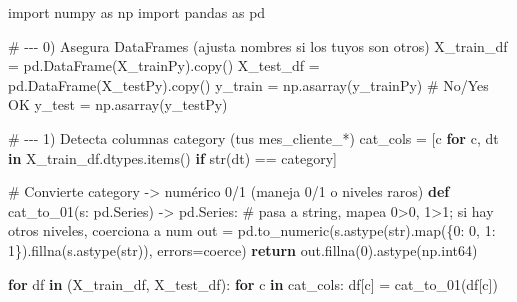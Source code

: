 \documentclass[
  letterpaper,
  DIV=11,
  numbers=noendperiod]{scrartcl}
\newenvironment{Shaded}{\begin{snugshade}}{\end{snugshade}}
\newcommand{\BuiltInTok}[1]{\textcolor[rgb]{0.00,0.23,0.31}{#1}}
\newcommand{\CommentTok}[1]{\textcolor[rgb]{0.37,0.37,0.37}{#1}}
\newcommand{\ControlFlowTok}[1]{\textcolor[rgb]{0.00,0.23,0.31}{\textbf{#1}}}
\newcommand{\DecValTok}[1]{\textcolor[rgb]{0.68,0.00,0.00}{#1}}
\newcommand{\ImportTok}[1]{\textcolor[rgb]{0.00,0.46,0.62}{#1}}
\newcommand{\KeywordTok}[1]{\textcolor[rgb]{0.00,0.23,0.31}{\textbf{#1}}}
\newcommand{\NormalTok}[1]{\textcolor[rgb]{0.00,0.23,0.31}{#1}}
\newcommand{\OperatorTok}[1]{\textcolor[rgb]{0.37,0.37,0.37}{#1}}
\newcommand{\StringTok}[1]{\textcolor[rgb]{0.13,0.47,0.30}{#1}}
\begin{document}
\begin{Shaded}
\begin{Highlighting}[]
\ImportTok{import}\NormalTok{ numpy }\ImportTok{as}\NormalTok{ np}
\ImportTok{import}\NormalTok{ pandas }\ImportTok{as}\NormalTok{ pd}

\CommentTok{\# {-}{-}{-} 0) Asegura DataFrames (ajusta nombres si los tuyos son otros)}
\NormalTok{X\_train\_df }\OperatorTok{=}\NormalTok{ pd.DataFrame(X\_trainPy).copy()}
\NormalTok{X\_test\_df  }\OperatorTok{=}\NormalTok{ pd.DataFrame(X\_testPy).copy()}
\NormalTok{y\_train }\OperatorTok{=}\NormalTok{ np.asarray(y\_trainPy)   }\CommentTok{\# \textquotesingle{}No\textquotesingle{}/\textquotesingle{}Yes\textquotesingle{} OK}
\NormalTok{y\_test  }\OperatorTok{=}\NormalTok{ np.asarray(y\_testPy)}

\CommentTok{\# {-}{-}{-} 1) Detecta columnas category (tus mes\_cliente\_*)}
\NormalTok{cat\_cols }\OperatorTok{=}\NormalTok{ [c }\ControlFlowTok{for}\NormalTok{ c, dt }\KeywordTok{in}\NormalTok{ X\_train\_df.dtypes.items() }\ControlFlowTok{if} \BuiltInTok{str}\NormalTok{(dt) }\OperatorTok{==} \StringTok{\textquotesingle{}category\textquotesingle{}}\NormalTok{]}

\CommentTok{\# Convierte category {-}\textgreater{} numérico 0/1 (maneja \textquotesingle{}0\textquotesingle{}/\textquotesingle{}1\textquotesingle{} o niveles raros)}
\KeywordTok{def}\NormalTok{ cat\_to\_01(s: pd.Series) }\OperatorTok{{-}\textgreater{}}\NormalTok{ pd.Series:}
    \CommentTok{\# pasa a string, mapea \textquotesingle{}0\textquotesingle{}{-}\textgreater{}0, \textquotesingle{}1\textquotesingle{}{-}\textgreater{}1; si hay otros niveles, coerciona a num}
\NormalTok{    out }\OperatorTok{=}\NormalTok{ pd.to\_numeric(s.astype(}\BuiltInTok{str}\NormalTok{).}\BuiltInTok{map}\NormalTok{(\{}\StringTok{\textquotesingle{}0\textquotesingle{}}\NormalTok{: }\StringTok{\textquotesingle{}0\textquotesingle{}}\NormalTok{, }\StringTok{\textquotesingle{}1\textquotesingle{}}\NormalTok{: }\StringTok{\textquotesingle{}1\textquotesingle{}}\NormalTok{\}).fillna(s.astype(}\BuiltInTok{str}\NormalTok{)),}
\NormalTok{                        errors}\OperatorTok{=}\StringTok{\textquotesingle{}coerce\textquotesingle{}}\NormalTok{)}
    \ControlFlowTok{return}\NormalTok{ out.fillna(}\DecValTok{0}\NormalTok{).astype(np.int64)}

\ControlFlowTok{for}\NormalTok{ df }\KeywordTok{in}\NormalTok{ (X\_train\_df, X\_test\_df):}
    \ControlFlowTok{for}\NormalTok{ c }\KeywordTok{in}\NormalTok{ cat\_cols:}
\NormalTok{        df[c] }\OperatorTok{=}\NormalTok{ cat\_to\_01(df[c])}


\end{Highlighting}
\end{Shaded}
\end{document}
